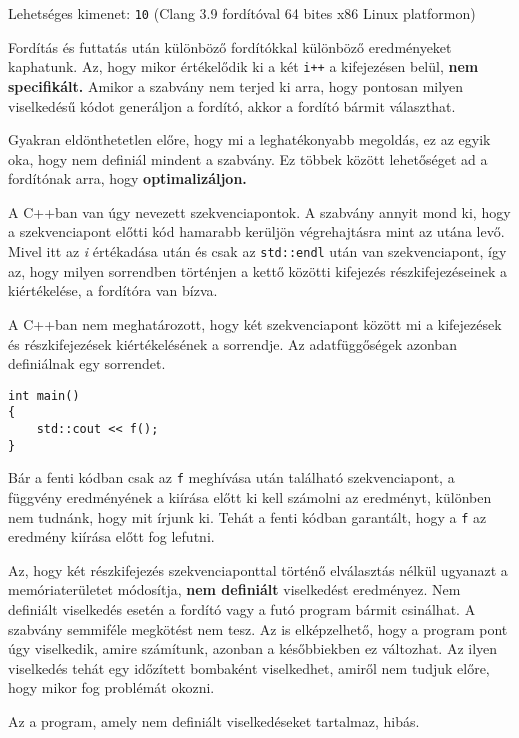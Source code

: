 \documentclass[../cpp_book/cpp_book.tex]{subfiles}
\begin{document}
	Lehetséges kimenet: \texttt{10} (Clang 3.9 fordítóval 64 bites x86 Linux platformon)
	\medskip
	
	Fordítás és futtatás után különböző fordítókkal különböző eredményeket kaphatunk. Az, hogy mikor értékelődik ki a két \texttt{i++} a kifejezésen belül, \textbf{nem specifikált.} Amikor a szabvány nem terjed ki arra, hogy pontosan milyen viselkedésű kódot generáljon a fordító, akkor a fordító bármit választhat. 
	\medskip
	
	Gyakran eldönthetetlen előre, hogy mi a leghatékonyabb megoldás, ez az egyik oka, hogy nem definiál mindent a szabvány.
	Ez többek között lehetőséget ad a fordítónak arra, hogy \textbf{optimalizáljon.} 
	\medskip
	
	A C++ban van úgy nevezett szekvenciapontok. A szabvány annyit mond ki, hogy a szekvenciapont előtti kód hamarabb kerüljön végrehajtásra mint az utána levő. Mivel itt az \textit{i} értékadása után és csak az \texttt{std::endl} után van szekvenciapont, így az, hogy milyen sorrendben történjen a kettő közötti kifejezés részkifejezéseinek a kiértékelése, a fordítóra van bízva.
	\medskip
	
	A C++ban nem meghatározott, hogy két szekvenciapont között mi a kifejezések és részkifejezések kiértékelésének a sorrendje. Az adatfüggőségek azonban definiálnak egy sorrendet.

	\begin{lstlisting}
int main()
{
	std::cout << f();
}
	\end{lstlisting}

	Bár a fenti kódban csak az \texttt{f} meghívása után található szekvenciapont, a függvény eredményének a kiírása előtt ki kell számolni az eredményt, különben nem tudnánk, hogy mit írjunk ki. Tehát a fenti kódban garantált, hogy a \texttt{f} az eredmény kiírása előtt fog lefutni.

	\medskip
	Az, hogy két részkifejezés szekvenciaponttal történő elválasztás nélkül ugyanazt a memóriaterületet módosítja, \textbf{nem definiált} viselkedést eredményez. Nem definiált viselkedés esetén a fordító vagy a futó program bármit csinálhat. A szabvány semmiféle megkötést nem tesz. Az is elképzelhető, hogy a program pont úgy viselkedik, amire számítunk, azonban a későbbiekben ez változhat. Az ilyen viselkedés tehát egy időzített bombaként viselkedhet, amiről nem tudjuk előre, hogy mikor fog problémát okozni.
	\begin{note}
		Az a program, amely nem definiált viselkedéseket tartalmaz, hibás.
	\end{note}
\end{document}

